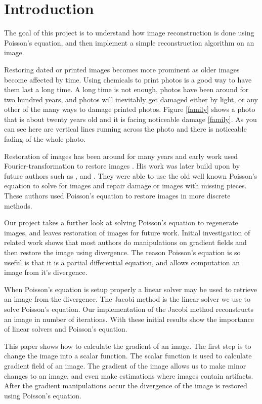 \documentclass[10pt,twopage]{acmsiggraph}
\begin{document}
\section{Introduction}
\label{Intro}
 

The goal of this project is to understand how image reconstruction is done using Poisson's equation, and then implement a simple reconstruction algorithm on an image.

Restoring dated or printed images becomes more prominent as older images become affected by time. Using chemicals to print photos is a good way to have them last a long time. A long time is not enough, photos have been around for two hundred years, and photos will inevitably get damaged either by light, or any other of the many ways to damage printed photos. Figure \ref{family} shows a photo that is about twenty years old and it is facing noticeable damage \ref{family}. As you can see here are vertical lines running across the photo and there is noticeable fading of the whole photo. 

Restoration of images has been around for many years and early work used Fourier-transformation to restore images \cite{richardson72}. His work was later build upon by future authors such as \cite{Bertalmio}, and \cite{Perez}. They were able to use the old well known Poisson's equation to solve for images and repair damage or images with missing pieces. These authors used Poisson's equation to restore images in more discrete methods.

Our project takes a further look at solving Poisson's equation to regenerate images, and leaves restoration of images for future work. Initial investigation of related work shows that most authors do manipulations on gradient fields and then restore the image using  divergence.  The reason Poisson's equation is so useful is that it is a partial differential equation, and allows computation an image from it's divergence. 

When Poisson's equation is setup properly a linear solver may be used to retrieve an image from the divergence. The Jacobi method is the linear solver we use to solve Poisson's equation. Our implementation of the Jacobi method reconstructs an image in \iteration number of iterations. With these initial results show the importance of linear solvers and Poisson's equation.

This paper shows how to calculate the gradient of an image. The first step is to change the image into a scalar function. The scalar function is used to calculate gradient field of an image. The gradient of the image allows us to make minor changes to an image, and even make estimations where images contain artifacts. After the gradient manipulations occur the divergence of the image is restored using Poisson's equation. 
\end{document}
